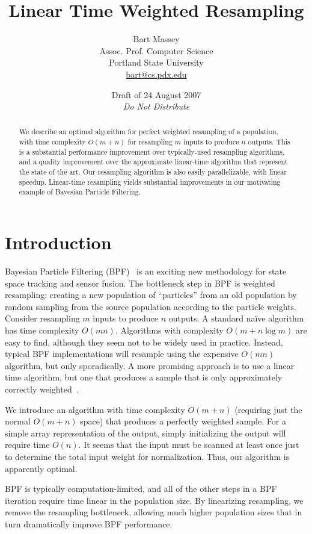 \documentclass[12pt]{article}
\title{Linear Time Weighted Resampling}
\author{Bart Massey\\
  Assoc. Prof. Computer Science\\
  Portland State University\\
  \url{bart@cs.pdx.edu}}
\date{Draft of 24 August 2007\\{\em Do Not Distribute}}
\begin{document}
  \maketitle

  \begin{abstract}
  We describe an optimal algorithm for perfect weighted
  resampling of a population, with time complexity $O(m +
  n)$ for resampling $m$ inputs to produce $n$ outputs.
  This is a substantial performance improvement over
  typically-used resampling algorithms, and a quality
  improvement over the approximate linear-time algorithm
  that represent the state of the art.  Our resampling
  algorithm is also easily parallelizable, with linear
  speedup.  Linear-time resampling yields substantial
  improvements in our motivating example of Bayesian
  Particle Filtering.
  \end{abstract}

\section{Introduction}

  Bayesian Particle Filtering (BPF)~\cite{bpf} is an exciting
  new methodology for state space tracking and sensor
  fusion.  The bottleneck step in BPF is weighted
  resampling: creating a new population of ``particles''
  from an old population by random sampling from the source
  population according to the particle weights.  Consider
  resampling $m$ inputs to produce $n$ outputs.  A standard
  na\"ive algorithm has time complexity $O(mn)$. Algorithms
  with complexity $O(m + n \log m)$ are easy to find,
  although they seem not to be widely used in practice.
  Instead, typical BPF implementations will resample using
  the expensive $O(mn)$ algorithm, but only sporadically.  A
  more promising approach is to use a linear time algorithm,
  but one that produces a sample that is only approximately
  correctly weighted~\cite{recount}.

  We introduce an algorithm with time complexity $O(m + n)$
  (requiring just the normal $O(m + n)$ space) that produces
  a perfectly weighted sample. For a simple array
  representation of the output, simply initializing the
  output will require time $O(n)$.  It seems that the input
  must be scanned at least once just to determine the total
  input weight for normalization.  Thus, our algorithm is
  apparently optimal.

  BPF is typically computation-limited, and all of the other
  steps in a BPF iteration require time linear in the
  population size.  By linearizing resampling, we remove the
  resampling bottleneck, allowing much higher population
  sizes that in turn dramatically improve BPF performance.
\end{document}
